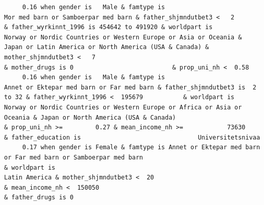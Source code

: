 \documentclass[
  letterpaper,
  DIV=11,
  numbers=noendperiod]{scrreprt}
\begin{document}
\begin{verbatim}
     0.16 when gender is   Male & famtype is                              Mor med barn or Samboerpar med barn & father_shjmndutbet3 <   2       & father_wyrkinnt_1996 is 454642 to 491920 & worldpart is            Norway or Nordic Countries or Western Europe or Asia or Oceania & Japan or Latin America or North America (USA & Canada) & mother_shjmndutbet3 <   7                                                  & mother_drugs is 0                           & prop_uni_nh <  0.58                                                                                                                                                                                                                                                                                                                                                                                         
     0.16 when gender is   Male & famtype is                        Annet or Ektepar med barn or Far med barn & father_shjmndutbet3 is  2 to 32 & father_wyrkinnt_1996 <  195679           & worldpart is                   Norway or Nordic Countries or Western Europe or Africa or Asia or Oceania & Japan or North America (USA & Canada)                                                                                                                            & prop_uni_nh >=         0.27 & mean_income_nh >=            73630                                                                                                                                                                                                                                                  & father_education is                                Universitetsnivaa                    
     0.17 when gender is Female & famtype is Annet or Ektepar med barn or Far med barn or Samboerpar med barn                                                                              & worldpart is                                                                                                                       Latin America & mother_shjmndutbet3 <  20                                                                                                                              & mean_income_nh <  150050                                                                                                                                                                                                                                        & father_drugs is 0                                                                                           

\end{verbatim}
\end{document}
